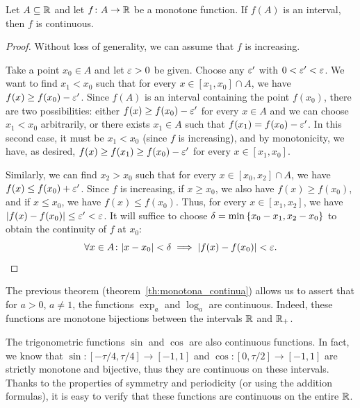   
\begin{theorem}
    \label{th:monotona_continua}%
    \mymark{*}%
    Let $A\subseteq {\mathbb R}$ and let
    $f\colon A \to {\mathbb R}$ be a monotone function.
    If $f(A)$ is an interval, then $f$ is continuous.
\end{theorem}
  \begin{proof}
  Without loss of generality, we can assume that $f$ 
  is increasing. 
  
  Take a point $x_0\in A$ and let $\varepsilon>0$ be given.
  Choose any $\varepsilon'$ with $0<\varepsilon'<\varepsilon$.
  We want to find $x_1<x_0$ such that  
  for every $x\in [x_1,x_0]\cap A$, we have $f(x)\ge f(x_0)-\varepsilon'$.
  Since $f(A)$ is an interval containing the point $f(x_0)$, 
  there are two possibilities: either $f(x)\ge f(x_0)-\varepsilon'$ for every $x\in A$
  and we can choose $x_1<x_0$ arbitrarily,
  or there exists $x_1\in A$ such that $f(x_1)=f(x_0) - \varepsilon'$.
  In this second case, it must be $x_1<x_0$ (since $f$ is increasing),
  and by monotonicity, we have, as desired, $f(x)\ge f(x_1) \ge f(x_0)-\varepsilon'$ 
  for every $x\in [x_1,x_0]$.
  
  Similarly, we can find $x_2>x_0$ such 
  that for every $x\in [x_0,x_2]\cap A$, we have $f(x) \le f(x_0)+\varepsilon'$.
  Since $f$ is increasing, if $x\ge x_0$, we also have $f(x)\ge f(x_0)$, 
  and if $x\le x_0$, we have $f(x) \le f(x_0)$. 
  Thus, for every $x\in [x_1,x_2]$, we have ${\left|f(x)-f(x_0)\right|}\le\varepsilon'<\varepsilon$.
  It will suffice to choose $\delta = \min{\left\{ x_0-x_1,x_2-x_0 \right\}}$ 
  to obtain the continuity of $f$ at $x_0$:
  \[
  \forall x\in A\colon {\left|x-x_0\right|}<\delta \implies {\left|f(x)-f(x_0)\right|}<\varepsilon.
  \]
\end{proof}

The previous theorem (theorem~\ref{th:monotona_continua}) 
allows us to assert that for $a>0$, $a\neq 1$, 
the functions $\exp_a$ and $\log_a$ are continuous. 
Indeed, these functions are monotone bijections between 
the intervals ${\mathbb R}$ and ${\mathbb R}_+$.

The trigonometric functions $\sin$ and $\cos$ are also continuous functions.
In fact, we know that $\sin \colon [-\tau/4,\tau /4]\to [-1,1]$
and $\cos\colon [0,\tau/2]\to [-1,1]$ are strictly monotone 
and bijective, thus they are continuous on these intervals. 
Thanks to the properties of symmetry and periodicity
(or using the addition formulas), it is easy to verify 
that these functions are continuous on the entire ${\mathbb R}$.

